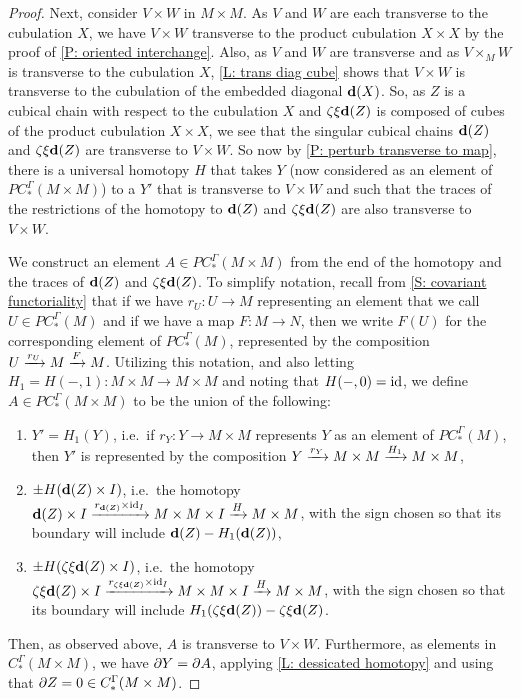 \documentclass{amsart}
\begin{document}
\begin{proof}
Next, consider $V\times W$ in $M\times M$. As $V$ and $W$ are each transverse to the cubulation $X$, we have $V\times W$ transverse to the product cubulation $X\times X$ by the proof of \cref{P: oriented interchange}. 
Also, as $V$ and $W$ are transverse and as $V\times_MW$ is transverse to the cubulation $X$, \cref{L: trans diag cube} shows that $V\times W$ is transverse to the cubulation of the embedded diagonal  $\mathbf{d}(X)$. So, as $Z$ is a cubical chain with respect to the cubulation $X$ and $\zeta\xi\mathbf{d}(Z)$ is composed of cubes of the product cubulation $X\times X$, we see that the singular cubical chains $\mathbf{d}(Z)$ and  $\zeta\xi\mathbf{d}(Z)$ are transverse to $V\times W$. So now by \cref{P: perturb transverse to map}, there is a universal homotopy $H$ that takes $Y$ (now considered as an element of $PC^\Gamma_*(M\times M)$) to a $Y'$ that is transverse to $V\times W$ and such that the traces of the restrictions of the homotopy to $\mathbf{d}(Z)$ and  $\zeta\xi\mathbf{d}(Z)$
are also transverse to  $V\times W$. 

We construct an element $A\in PC^\Gamma_*(M\times M)$ from the end of the homotopy and the traces of $\mathbf{d}(Z)$ and $\zeta\xi\mathbf{d}(Z)$. To simplify notation, recall from \cref{S: covariant functoriality} that if we have $r_U:U\to M$ representing an element that we call $U\in PC^\Gamma_*(M)$ and if we have a map $F:M\to N$, then we write $F(U)$ for the corresponding element of $PC^\Gamma_*(M)$, represented by the composition $U\xrightarrow{r_U}M\xrightarrow{F}M$.
Utilizing this notation, and also letting $H_1=H(-,1):M\times M\to M\times M$ and noting that $H(-,0)=\mathrm{id}$, we define $A\in PC^\Gamma_*(M\times M)$ to be the union of the following:
\begin{enumerate}
\item $Y'=H_1(Y)$, i.e.\ if $r_Y:Y\to M\times M$ represents $Y$ as an element of $PC^\Gamma_*(M)$, then $Y'$ is represented by  the composition $Y\xrightarrow{r_Y} M\times M\xrightarrow{H_1}M\times M$, 

\item $\pm H(\mathbf{d}(Z)\times I)$, i.e.\ the homotopy $\mathbf{d}(Z)\times I\xrightarrow{r_{\mathbf{d}(Z)}\times \mathrm{id}_I} M\times M\times I\xrightarrow{H}M\times M$, with the sign chosen so that its boundary will include $\mathbf{d}(Z)-H_1(\mathbf{d}(Z))$,

\item $\pm H(\zeta\xi\mathbf{d}(Z)\times I)$, i.e.\ the homotopy $\zeta\xi\mathbf{d}(Z)\times I\xrightarrow{r_{\zeta\xi\mathbf{d}(Z)}\times \mathrm{id}_I} M\times M\times I\xrightarrow{H}M\times M$, with the sign chosen so that its boundary will include $H_1(\zeta\xi\mathbf{d}(Z))-\zeta\xi\mathbf{d}(Z)$.
\end{enumerate}
Then, as observed above, $A$ is transverse to $V\times W$. Furthermore, as elements in $C_*^\Gamma(M\times M)$, we have $\partial Y=\partial A$, applying \cref{L: dessicated homotopy} and using that $\partial Z=0\in C_*^\Gamma(M\times M)$.




\end{proof}
\end{document}
